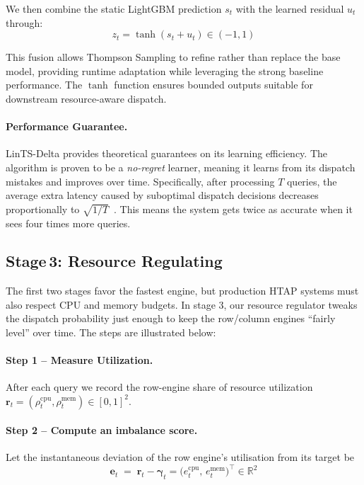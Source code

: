 \documentclass[sigconf, nonacm]{acmart}
\begin{document}
We then combine the static LightGBM prediction $s_t$ with the learned residual $u_t$ through:
\begin{equation}
z_t=\tanh(s_t+u_t)\in(-1,1)
\end{equation}

This fusion allows Thompson Sampling to refine rather than replace the base model, providing runtime adaptation while leveraging the strong baseline performance. The $\tanh$ function ensures bounded outputs suitable for downstream resource-aware dispatch.

\paragraph{Performance Guarantee.}
LinTS-Delta provides theoretical guarantees on its learning efficiency. The algorithm is proven to be a \emph{no-regret} learner, meaning it learns from its dispatch mistakes and improves over time. Specifically, after processing $T$ queries, the average extra latency caused by suboptimal dispatch decisions decreases proportionally to $\sqrt{1/T}$~\cite{lattimore2020bandit,russo2018tutorial}. This means the system gets twice as accurate when it sees four times more queries.


\subsection{Stage\,3: Resource Regulating}\label{ssec:online_resource}

The first two stages favor the fastest engine, but production HTAP
systems must also respect CPU and memory budgets.  
In stage 3, our resource regulator tweaks the dispatch probability just
enough to keep the row/column engines “fairly level” over time. 
The steps are illustrated below:

\paragraph{Step 1 – Measure Utilization.}
After each query we record the row-engine share of resource utilization
\(
  \mathbf r_t = (\rho_t^{\text{cpu}},\rho_t^{\text{mem}})\in[0,1]^2.
\)

\paragraph{Step 2 – Compute an imbalance score.}
Let the instantaneous deviation of the row engine’s utilisation from
its target be
\begin{equation}
  \mathbf e_t \;=\;
     \mathbf r_t - \boldsymbol\gamma_t
   = \bigl(e_t^{\text{cpu}},\,e_t^{\text{mem}}\bigr)^{\!\top}\in\mathbb{R}^2 
\end{equation}
\end{document}
